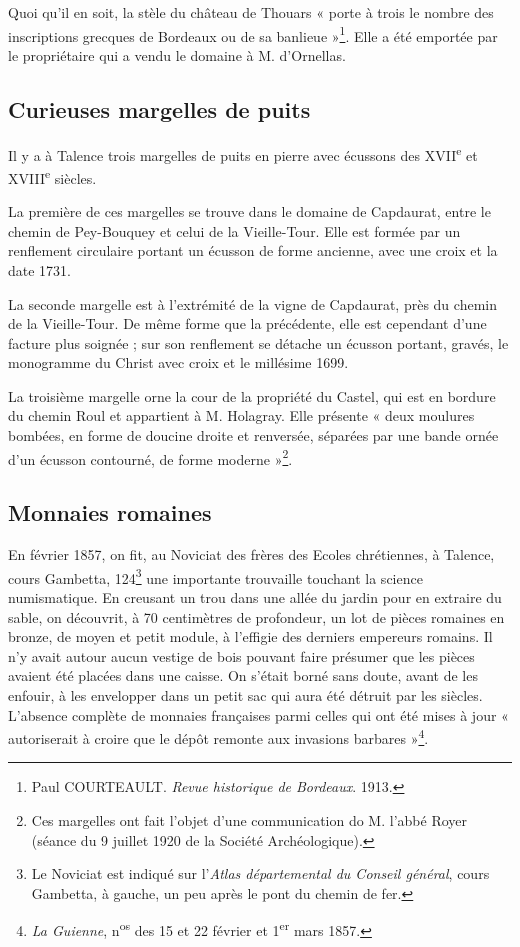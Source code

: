 \documentclass[a4paper,11pt]{book}
\begin{document}
Quoi qu'il en soit, la stèle du château de Thouars « porte à trois le nombre des inscriptions grecques de Bordeaux ou de sa banlieue »\footnote{Paul \textsc{COURTEAULT}. \textit{Revue historique de Bordeaux}. 1913.}. Elle a été emportée par le propriétaire qui a vendu le domaine à M. d'Ornellas.

\subsection{Curieuses margelles de puits}

Il y a à Talence trois margelles de puits en pierre avec écussons des XVII\textsuperscript{e} et XVIII\textsuperscript{e} siècles.

La première de ces margelles se trouve dans le domaine de Capdaurat, entre le chemin de Pey-Bouquey et celui de la Vieille-Tour. Elle est formée par un renflement circulaire portant un écusson de forme ancienne, avec une croix et la date 1731.

La seconde margelle est à l'extrémité de la vigne de Capdaurat, près du chemin de la Vieille-Tour. De même forme que la précédente, elle est cependant d'une facture plus soignée ; sur son renflement se détache un écusson portant, gravés, le monogramme du Christ avec croix et le millésime 1699.

La troisième margelle orne la cour de la propriété du Castel, qui est en bordure du chemin Roul et appartient à M. Holagray. Elle présente « deux moulures bombées, en forme de doucine droite et renversée, séparées par une bande ornée d'un écusson contourné, de forme moderne »\footnote{Ces margelles ont fait l'objet d'une communication do M. l'abbé Royer (séance du 9 juillet 1920 de la Société Archéologique).}.

\subsection{Monnaies romaines}

En février 1857, on fit, au Noviciat des frères des Ecoles
chrétiennes, à Talence, cours Gambetta, 124\footnote{Le Noviciat est indiqué sur l'\textit{Atlas départemental du Conseil général}, cours Gambetta, à gauche, un peu après le pont du chemin de fer.} une importante trouvaille touchant la science numismatique. En creusant un trou dans une allée du jardin pour en extraire du sable, on découvrit, à 70 centimètres de profondeur, un lot de pièces romaines en bronze, de moyen et petit module, à l'effigie des derniers empereurs romains. Il n'y avait autour aucun vestige de bois pouvant faire présumer que les pièces avaient été placées dans une caisse. On s'était borné sans doute, avant de les enfouir, à les envelopper dans un petit sac qui aura été détruit par les siècles. L'absence complète de monnaies françaises parmi celles qui ont été mises à jour « autoriserait à croire que le dépôt remonte aux invasions barbares »\footnote{\textit{La Guienne}, n\textsuperscript{os} des 15 et 22 février et 1\textsuperscript{er} mars 1857.}.
\end{document}
